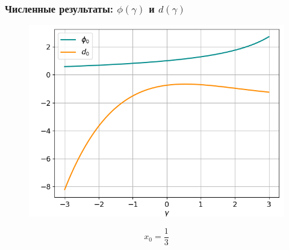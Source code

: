 \documentclass[fullscreen=true, unicode, bookmarks=false]{beamer}
\begin{document}
\begin{frame}
\frametitle{ Численные результаты: $ \phi(\gamma) $ и $ d(\gamma) $ }

\begin{figure} 
\includegraphics[scale=0.53]{divergent_phi0d0_13.png}  
\end{figure}

$$ x_0 = \frac{1}{3} $$

\end{frame}
\end{document}
